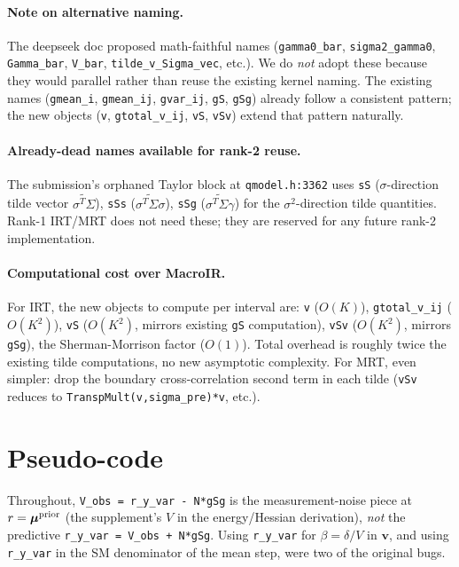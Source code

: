 \documentclass[11pt]{article}
\begin{document}
\paragraph{Note on alternative naming.}
The deepseek doc proposed math-faithful names (\texttt{gamma0\_bar},
\texttt{sigma2\_gamma0}, \texttt{Gamma\_bar}, \texttt{V\_bar}, \texttt{tilde\_v\_Sigma\_vec},
etc.). We do \emph{not} adopt these because they would parallel rather than
reuse the existing kernel naming. The existing names
(\texttt{gmean\_i}, \texttt{gmean\_ij}, \texttt{gvar\_ij}, \texttt{gS}, \texttt{gSg})
already follow a consistent pattern; the new objects (\texttt{v},
\texttt{gtotal\_v\_ij}, \texttt{vS}, \texttt{vSv}) extend that pattern naturally.

\paragraph{Already-dead names available for rank-2 reuse.}
The submission's orphaned Taylor block at \texttt{qmodel.h:3362} uses
\texttt{sS} (\(\sigma\)-direction tilde vector \(\widetilde{\sigma^{T}\Sigma}\)),
\texttt{sSs} (\(\widetilde{\sigma^{T}\Sigma\sigma}\)), \texttt{sSg}
(\(\widetilde{\sigma^{T}\Sigma\gamma}\)) for the \(\sigma^2\)-direction tilde
quantities. Rank-1 IRT/MRT does not need these; they are reserved for any
future rank-2 implementation.

\paragraph{Computational cost over MacroIR.}
For IRT, the new objects to compute per interval are: \texttt{v} ($O(K)$),
\texttt{gtotal\_v\_ij} ($O(K^2)$), \texttt{vS} ($O(K^2)$, mirrors existing
\texttt{gS} computation), \texttt{vSv} ($O(K^2)$, mirrors \texttt{gSg}),
the Sherman-Morrison factor ($O(1)$). Total overhead is roughly twice the
existing tilde computations, no new asymptotic complexity. For MRT, even
simpler: drop the boundary cross-correlation second term in each tilde
(\texttt{vSv} reduces to \texttt{TranspMult(v,sigma\_pre)*v}, etc.).

\section{Pseudo-code}

Throughout, \texttt{V\_obs = r\_y\_var - N*gSg} is the measurement-noise piece at $r=\boldsymbol{\mu}^{\mathrm{prior}}$ (the supplement's $V$ in the energy/Hessian derivation), \emph{not} the predictive \texttt{r\_y\_var = V\_obs + N*gSg}. Using \texttt{r\_y\_var} for $\beta = \delta/V$ in $\mathbf{v}$, and using \texttt{r\_y\_var} in the SM denominator of the mean step, were two of the original bugs.
\end{document}

